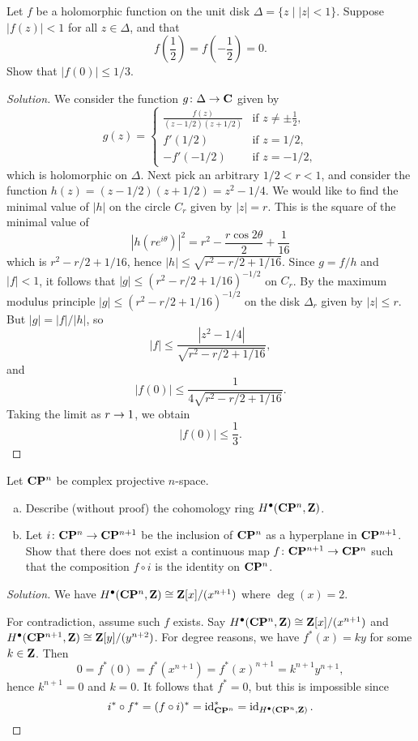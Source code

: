 
Let $f$ be a holomorphic function on the unit disk $\Delta = \{ z \;|\; |z| < 1 \}$. Suppose $|f(z)| < 1$ for all $z \in \Delta$, and that
\[
f\left( \frac{1}{2} \right) = f\left( -\frac{1}{2} \right) = 0.
\]
Show that $|f(0)| \leq 1/3$.

\begin{proof}[Solution]
  We consider the function $g \colon \Delta \rightarrow \mathbf{C}$ given by
  \[
  g(z) =
  \begin{cases}
    \displaystyle\frac{f(z)}{(z - 1/2)(z + 1/2)} & \textrm{if } z \neq \pm\frac{1}{2}, \\
    f'(1/2) & \textrm{if } z = 1/2, \\
    -f'(-1/2) & \textrm{if } z = -1/2,
  \end{cases}
  \]
  which is holomorphic on $\Delta$. Next pick an arbitrary $1/2 < r < 1$, and consider the function $h(z) = (z-1/2)(z+1/2) = z^2 - 1/4$. We would like to find the minimal value of $|h|$ on the circle $C_r$ given by $|z| = r$. This is the square of the minimal value of
  \[
  |h(r e^{i\theta})|^2 =
  r^2 - \frac{r \cos 2\theta}{2} + \frac{1}{16}
  \]
  which is $r^2 - r/2 + 1/16$, hence $|h| \leq \sqrt{r^2 - r/2 + 1/16}$. Since $g = f/h$ and $|f| < 1$, it follows that $|g| \leq (r^2 - r/2 + 1/16)^{-1/2}$ on $C_r$. By the maximum modulus principle $|g| \leq (r^2 - r/2 + 1/16)^{-1/2}$ on the disk $\Delta_r$ given by $|z| \leq r$. But $|g| = |f|/|h|$, so
  \[
  |f| \leq \frac{|z^2 - 1/4|}{\sqrt{r^2 - r/2 + 1/16}},
  \]
  and
  \[
  |f(0)| \leq \frac{1}{4 \sqrt{r^2 - r/2 + 1/16}}.
  \]
  Taking the limit as $r \rightarrow 1$, we obtain
  \[
  |f(0)| \leq \frac{1}{3}.
  \]  
\end{proof}


Let $\mathbf{C}\mathbf{P}^n$ be complex projective $n$-space.
\begin{enumerate}[(a)]
\item Describe (without proof) the cohomology ring $H^\bullet(\mathbf{C}\mathbf{P}^n, \mathbf{Z})$.
\item Let $i \colon \mathbf{C}\mathbf{P}^n \rightarrow \mathbf{C}\mathbf{P}^{n+1}$ be the inclusion of $\mathbf{C}\mathbf{P}^n$ as a hyperplane in $\mathbf{C}\mathbf{P}^{n+1}$. Show that there does not exist a continuous map $f \colon \mathbf{C}\mathbf{P}^{n+1} \rightarrow \mathbf{C}\mathbf{P}^n$ such that the composition $f \circ i$ is the identity on $\mathbf{C}\mathbf{P}^n$.
\end{enumerate}


\begin{proof}[Solution]
  We have $H^\bullet(\mathbf{C}\mathbf{P}^n, \mathbf{Z}) \cong \mathbf{Z}[x]/(x^{n+1})$ where $\deg(x) = 2$.

  For contradiction, assume such $f$ exists. Say $H^\bullet(\mathbf{C}\mathbf{P}^n, \mathbf{Z}) \cong \mathbf{Z}[x]/(x^{n+1})$ and $H^\bullet(\mathbf{C}\mathbf{P}^{n+1}, \mathbf{Z}) \cong \mathbf{Z}[y]/(y^{n+2})$. For degree reasons, we have $f^\ast(x) = k y$ for some $k \in \mathbf{Z}$. Then
  \[
  0 = f^\ast(0) = f^\ast(x^{n+1}) = f^\ast(x)^{n+1} = k^{n+1} y^{n+1},
  \]
  hence $k^{n+1} = 0$ and $k = 0$. It follows that $f^\ast = 0$, but this is impossible since
  \[
  i^\ast \circ f^\ast = (f \circ i)^\ast = \operatorname{id}_{\mathbf{C}\mathbf{P}^n}^\ast = \operatorname{id}_{H^\bullet(\mathbf{C}\mathbf{P}^n, \mathbf{Z})}.
  \]  
\end{proof}

